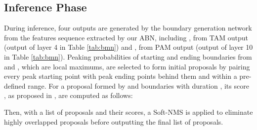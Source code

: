 \documentclass{ieeeaccess}
\begin{document}
\subsection{Inference Phase}
During inference, four outputs are generated by the boundary generation network from the features sequence extracted by our ABN, including ,  from TAM output (output of layer 4 in Table \ref{tab:bmn}) and ,  from PAM output (output of layer 10 in Table \ref{tab:bmn}). Peaking probabilities of starting and ending boundaries from  and , which are local maximums, are selected to form initial proposals by pairing every peak starting point with peak ending points behind them and within a pre-defined range. For a proposal formed by  and  boundaries with duration , its score , as proposed in \cite{bmn}, are computed as follows:

Then, with a list of proposals and their scores, a Soft-NMS \cite{SoftNMS} is applied to eliminate highly overlapped proposals before outputting the final list of proposals.
\end{document}

